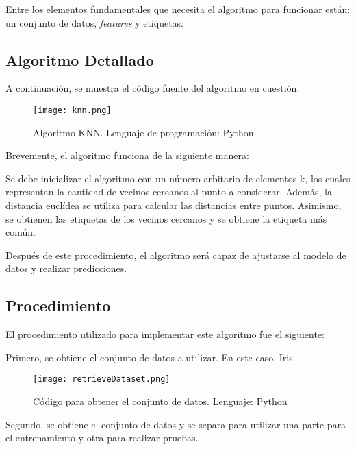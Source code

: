 \documentclass{article_saj}
\begin{document}
Entre los elementos fundamentales que necesita el algoritmo para funcionar están: un conjunto de datos, \textit{features} y etiquetas.

\subsection{Algoritmo Detallado}

\indent

A continuación, se muestra el código fuente del algoritmo en cuestión.

\begin{figure}[H]
\centerline{\texttt{[image: knn.png]}}
\caption{Algoritmo KNN. Lenguaje de programación: Python}
\label{fig5}
\end{figure}

Brevemente, el algoritmo funciona de la siguiente manera:

\indent

Se debe inicializar el algoritmo con un número arbitario de elementos k, los cuales representan la cantidad de vecinos cercanos al punto a considerar. Además, la distancia euclídea se utiliza para  calcular las distancias entre puntos. Asimismo, se obtienen las etiquetas de los vecinos cercanos y se obtiene la etiqueta más común. 
\indent

Después de este procedimiento, el algoritmo será capaz de ajustarse al modelo de datos y realizar predicciones. 

\subsection{Procedimiento}

\indent

El procedimiento utilizado para implementar este algoritmo fue el siguiente: 

\indent

Primero, se obtiene el conjunto de datos a utilizar. En este caso, Iris.

\begin{figure}[H]
\centerline{\texttt{[image: retrieveDataset.png]}}
\caption{Código para obtener el conjunto de datos. Lenguaje: Python}
\label{fig6}
\end{figure}

\indent

Segundo, se obtiene el conjunto de datos y se separa para utilizar una parte para el entrenamiento y otra para realizar pruebas.
\end{document}
